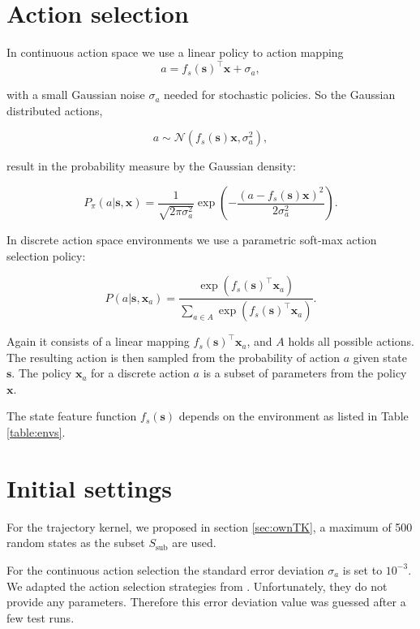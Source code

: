 \section{Action selection}
\label{sec:actionselection}
In continuous action space we use a linear policy to action mapping
\begin{equation} \label{eq:actionselection}
    a = f_s(\mathbf{s})^\top \mathbf{x} + \sigma_a,
\end{equation}

with a small Gaussian noise $\sigma_a$ needed for stochastic policies. So the Gaussian distributed actions,

$$a \sim \mathcal{N}(f_s(\mathbf{s}) \mathbf{x},\sigma_a^2),$$

result in the probability measure by the Gaussian density:

\begin{equation}\label{eq:contiAS}
    P_{\pi}(a|\mathbf{s},\mathbf{x}) = \frac{1}{\sqrt{2\pi\sigma_a^2}}\exp\left(-\frac{(a-f_s(\mathbf{s})\mathbf{x})^2}{2\sigma_a^2}\right).
\end{equation}

In discrete action space environments we use a parametric soft-max action selection policy:

\begin{equation} \label{eq:discreteactionselection}
    P(a|\mathbf{s},\mathbf{x}_a)= \frac{\exp(f_s(\mathbf{s})^\top \mathbf{x}_a)}{\sum_{a\in A} \exp(f_s(\mathbf{s})^\top \mathbf{x}_a)}.
\end{equation}

Again it consists of a linear mapping $f_s(\mathbf{s})^\top \mathbf{x}_a$, and $A$ holds all possible actions. The resulting action is then sampled from the probability of action $a$ given state $\mathbf{s}$. The policy $\mathbf{x}_a$ for a discrete action $a$ is a subset of parameters from the policy $\mathbf{x}$.

The state feature function $f_s(\mathbf{s})$ depends on the environment as listed in Table \ref{table:envs}.

\section{Initial settings}

For the trajectory kernel, we proposed in section \ref{sec:ownTK}, a maximum of 500 random states as the subset $S_{\text{sub}}$ are used.

For the continuous action selection the standard error deviation $\sigma_a$ is set to $10^{-3}$. We adapted the action selection strategies from \cite{wilson2014using}. Unfortunately, they do not provide any parameters. Therefore this error deviation value was guessed after a few test runs.

